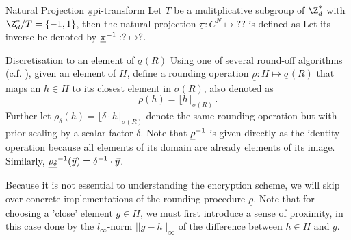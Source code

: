 \begin{definition}{Natural Projection $\underline{\pi}$}{pi-transform}
  Let $T$ be a mulitplicative subgroup of $\Z_d^*$ with $\Z_d^* / T = \{-1, 1\}$, then the natural projection $\underline{\pi}: C^N \mapsto ??$ is defined as %
  Let its inverse be denoted by $\underline{\pi}^{-1}: ? \mapsto ?$.
\end{definition}
\begin{definition}{Discretisation to an element of $\underline{\sigma}(R)$}{}
  Using one of several round-off algorithms (c.f. \cite{2013-rlwe-toolkit}), given an element of $H$, define a rounding operation $\underline{\rho}: H \mapsto \underline{\sigma}(R)$ that maps an $h \in H$ to its closest element in $\underline{\sigma}(R)$, also denoted as
  $$\underline{\rho}(h) = \lfloor h \rceil_{\underline{\sigma}(R)}\,.$$
  Further let $\underline{\rho_\delta}(h) = \lfloor \delta \cdot h \rceil_{\underline{\sigma}(R)}$ denote the same rounding operation but with prior scaling by a scalar factor $\delta$.
  Note that $\underline{\rho}^{-1}$ is given directly as the identity operation because all elements of its domain are already elements of its image. Similarly, $\underline{\rho_\delta}^{-1}(\vec{y}) = \delta^{-1} \cdot \vec{y}$.
\end{definition}

Because it is not essential to understanding the encryption scheme, we will skip over concrete implementations of the rounding procedure $\underline{\rho}$.
Note that for choosing a 'close' element $g \in H$, we must first introduce a sense of proximity, in this case done by the $l_\infty$-norm $||g - h||_\infty$ of the difference between $h \in H$ and $g$.

